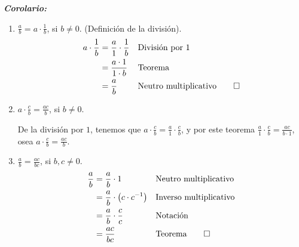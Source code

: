 \documentclass[11pt]{article}
\begin{document}
\begin{enumerate}[label=\alph*)]
    \textbf{\textit{Corolario:}}\begin{enumerate}[label=\roman*)]
        \item $\frac{a}{b}=a\cdot \frac{1}{b}$, si $b\neq 0$. (Definición de la división).
        \begin{align*}
            a \cdot \frac{1}{b} &= \frac{a}{1}\cdot \frac{1}{b} && \text{División por $1$}\\
            &= \frac{a\cdot 1}{1\cdot b} && \text{Teorema}\\
            &= \frac{a}{b} && \text{Neutro multiplicativo} \qedhere
        \end{align*}

        \item $a \cdot \frac{c}{b} = \frac{ac}{b}$, si $b \neq 0$.
        
        De la división por $1$, tenemos que $a\cdot \frac{c}{b}=\frac{a}{1}\cdot \frac{c}{b}$, y por este teorema $\frac{a}{1}\cdot \frac{c}{b}=\frac{ac}{b\cdot 1}$, osea $a \cdot \frac{c}{b} = \frac{ac}{b}$.
        
        \item $\frac{a}{b} = \frac{ac}{bc}$, si $b,c \neq 0$.\begin{align*}
            \frac{a}{b}&=\frac{a}{b}\cdot 1 && \text{Neutro multiplicativo}\\
            &= \frac{a}{b}\cdot \bigl(c \cdot c^{-1}\bigr) && \text{Inverso multiplicativo}\\
            &= \frac{a}{b} \cdot \frac{c}{c} && \text{Notación}\\
            &= \frac{ac}{bc} && \text{Teorema} \qedhere
        \end{align*}


\end{enumerate}
\end{enumerate}
\end{document}

